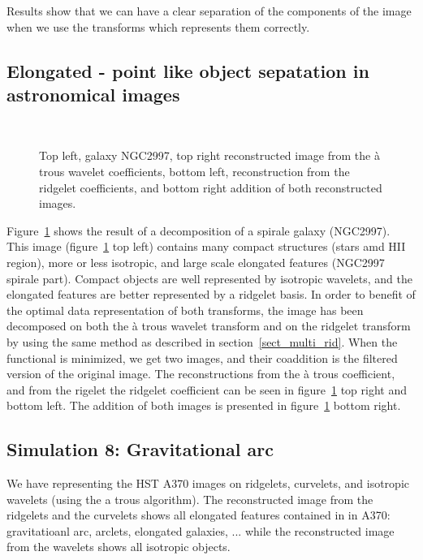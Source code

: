 \documentclass[11pt,a4paper]{article}
\begin{document}
 
Results show that we can have a clear separation of the components of the image
when we use the transforms which represents them correctly.

\subsection{Elongated - point like object sepatation in astronomical images}

\begin{figure}[htb]
\centerline{
\vbox{
\hbox{
}
\hbox{
}}}
\caption{Top left, galaxy NGC2997, top right reconstructed image from
the \`a trous wavelet coefficients, bottom left, reconstruction from
the ridgelet coefficients, and bottom right addition of both reconstructed
images.}
\label{fig_cb2_ngc}
\end{figure}
Figure~\ref{fig_cb2_ngc} shows the result of a decomposition 
of a spirale galaxy (NGC2997).
This image (figure~\ref{fig_cb2_ngc} top left) contains
many compact structures (stars amd HII region), more
or less isotropic, and large scale elongated features (NGC2997 spirale part).
Compact objects are well represented by isotropic wavelets, and the  
elongated features are better represented by a ridgelet basis. 
In order to benefit of the optimal data representation of both transforms,
 the image has been decomposed on both the \`a trous wavelet transform and on 
the ridgelet transform by using the same method as described in
section~\ref{sect_multi_rid}. When the functional is minimized, we get two 
images, and their coaddition is the filtered version of the original image.
The reconstructions from the \`a trous coefficient, and from the rigelet
the ridgelet coefficient can be seen in figure~\ref{fig_cb2_ngc} top right
and bottom left. The addition of both images is presented 
in figure~\ref{fig_cb2_ngc} bottom right.




\subsection{Simulation 8: Gravitational arc}
We have representing the HST A370 images on ridgelets, curvelets, and isotropic
wavelets (using the a trous algorithm). The reconstructed image from
the ridgelets and the curvelets shows all elongated features contained in
in A370: gravitatioanl arc, arclets, elongated galaxies, ... while the
reconstructed image from the wavelets shows all isotropic objects.
\end{document}
